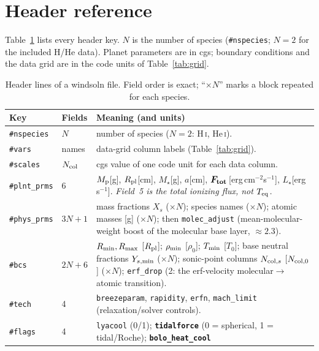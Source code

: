\documentclass[english,a4paper]{my_memo}
\newcommand{\Rp}{\ensuremath{R_{\rm pl}}}
\newcommand{\code}[1]{\texttt{#1}}
\newcommand{\Ftot}{\ensuremath{F_{\rm tot}}}
\newcommand{\hd}[1]{\code{\##1}}      %
\begin{document}
\section{Header reference}
Table~\ref{tab:hdr} lists every header key. $N$ is the number of species
(\hd{nspecies}; $N=2$ for the included H/He data). Planet parameters are in
cgs; boundary conditions and the data grid are in the code units of
Table~\ref{tab:grid}.

\begin{table}[t]\centering\small
\caption{Header lines of a windsoln file. Field order is exact;
``$\times N$'' marks a block repeated for each species.}
\label{tab:hdr}
\begin{tabular}{@{}l l p{8.4cm}@{}}
\toprule
Key & Fields & Meaning (and units) \\
\midrule
\hd{nspecies}  & $N$ & number of species ($N=2$: H\,\textsc{i}, He\,\textsc{i}). \\
\hd{vars}      & names & data-grid column labels (Table~\ref{tab:grid}). \\
\hd{scales}    & $N_{\rm col}$ & cgs value of one code unit for each data column. \\
\hd{plnt\_prms}& 6 & $M_{\rm p}$[g], $\Rp$[cm], $M_\star$[g], $a$[cm],
                     $\boldsymbol{\Ftot}$\,[erg\,cm$^{-2}$s$^{-1}$],
                     $L_\star$[erg\,s$^{-1}$]. \emph{Field~5 is the total
                     ionizing flux, not $T_{\rm eq}$.} \\
\hd{phys\_prms}& $3N{+}1$ & mass fractions $X_s$ ($\times N$); species names
                     ($\times N$); atomic masses [g] ($\times N$);
                     then \code{molec\_adjust} (mean-molecular-weight boost
                     of the molecular base layer, $\approx2.3$). \\
\hd{bcs}       & $2N{+}6$ & $R_{\rm min},R_{\rm max}$ [$\Rp$];
                     $\rho_{\rm min}$ [$\rho_0$]; $T_{\rm min}$ [$T_0$];
                     base neutral fractions $Y_{s,\rm min}$ ($\times N$);
                     sonic-point columns $N_{{\rm col},s}$ [$N_{\rm col,0}$]
                     ($\times N$); \code{erf\_drop} (2: the erf-velocity
                     molecular$\to$atomic transition). \\
\hd{tech}      & 4 & \code{breezeparam}, \code{rapidity}, \code{erfn},
                     \code{mach\_limit} (relaxation/solver controls). \\
\hd{flags}     & 4 & \code{lyacool} (0/1); \textbf{\code{tidalforce}}
                     (0 = spherical, 1 = tidal/Roche); \textbf{\code{bolo\_heat\_cool}}

\end{tabular}
\end{table}
\end{document}
